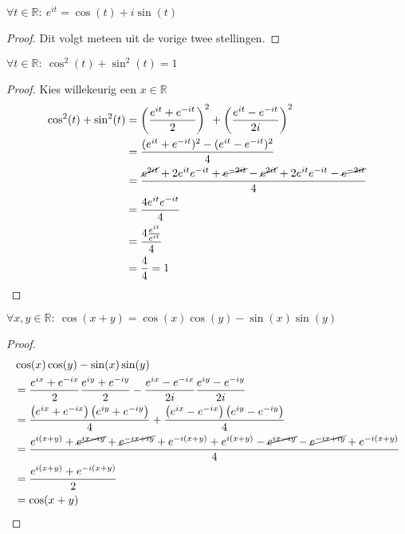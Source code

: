\documentclass[main.tex]{subfiles}
\begin{document}
\begin{bpr}
  $\forall t\in \mathbb{R}:\ e^{it} = \cos(t) + i\sin(t)$

  \begin{proof}
    Dit volgt meteen uit de vorige twee stellingen.
  \end{proof}
\end{bpr}

\begin{bpr}
  $\forall t\in \mathbb{R}:\ \cos^{2}(t) + \sin^{2}(t) = 1$

  \begin{proof}
    Kies willekeurig een $x\in \mathbb{R}$
    \begin{align*}
      \cos^{2}(t) + \sin^{2}(t)
      &=  \left(\frac{e^{it} + e^{-it}}{2}\right)^{2} + \left(\frac{e^{it} - e^{-it}}{2i}\right)^{2}\\
      &=  \frac{(e^{it} + e^{-it})^{2}-(e^{it} - e^{-it})^{2}}{4}\\
      &=  \frac{\cancel{e^{2it}} +2e^{it}e^{-it} +\cancel{e^{-2it}}-\cancel{e^{2it}} +2e^{it}e^{-it}- \cancel{e^{-2it}}}{4}\\
      &=  \frac{4e^{it}e^{-it}}{4}\\
      &=  \frac{4\frac{e^{it}}{e^{it}}}{4}\\
      &=  \frac{4}{4}
      = 1
    \end{align*}
  \end{proof}
\end{bpr}

\begin{bpr}
  $\forall x,y\in \mathbb{R}:\ \cos(x+y) = \cos(x)\cos(y) - \sin(x)\sin(y)$

  \begin{proof}
    \begin{align*}
      &\cos(x)\cos(y) - \sin(x)\sin(y)\\
      &= \frac{e^{ix} + e^{-ix}}{2}\frac{e^{iy} + e^{-iy}}{2} - \frac{e^{ix} - e^{-ix}}{2i}\frac{e^{iy} - e^{-iy}}{2i}\\
      &= \frac{\left(e^{ix} + e^{-ix}\right)\left(e^{iy} + e^{-iy}\right)}{4} + \frac{\left(e^{ix} - e^{-ix}\right)\left(e^{iy} - e^{-iy}\right)}{4}\\
      &= \frac{e^{i(x+y)} + \cancel{e^{ix - iy}} + \cancel{e^{-ix +iy}} + e^{-i(x+y)} + e^{i(x+y)} - \cancel{e^{ix-iy}} -\cancel{e^{-ix+iy}} + e^{-i(x+y)}}{4}\\
      &= \frac{e^{i(x+y)} + e^{-i(x+y)}}{2}\\
      &= \cos(x+y)
    \end{align*}
  \end{proof}
\end{bpr}
\end{document}
